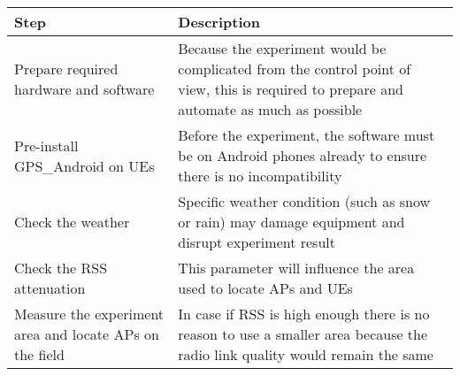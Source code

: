 \begin{longtable}[]{@{}ll@{}}
\toprule
\begin{minipage}[b]{0.27\columnwidth}\raggedright
Step\strut
\end{minipage} & \begin{minipage}[b]{0.67\columnwidth}\raggedright
Description\strut
\end{minipage}\tabularnewline
\midrule
\endhead
\begin{minipage}[t]{0.27\columnwidth}\raggedright
Prepare required hardware and software\strut
\end{minipage} & \begin{minipage}[t]{0.67\columnwidth}\raggedright
Because the experiment would be complicated from the control point of
view, this is required to prepare and automate as much as possible\strut
\end{minipage}\tabularnewline
\begin{minipage}[t]{0.27\columnwidth}\raggedright
Pre-install GPS\_Android on UEs\strut
\end{minipage} & \begin{minipage}[t]{0.67\columnwidth}\raggedright
Before the experiment, the software must be on Android phones already to
ensure there is no incompatibility\strut
\end{minipage}\tabularnewline
\begin{minipage}[t]{0.27\columnwidth}\raggedright
Check the weather\strut
\end{minipage} & \begin{minipage}[t]{0.67\columnwidth}\raggedright
Specific weather condition (such as snow or rain) may damage equipment
and disrupt experiment result\strut
\end{minipage}\tabularnewline
\begin{minipage}[t]{0.27\columnwidth}\raggedright
Check the RSS attenuation\strut
\end{minipage} & \begin{minipage}[t]{0.67\columnwidth}\raggedright
This parameter will influence the area used to locate APs and UEs\strut
\end{minipage}\tabularnewline
\begin{minipage}[t]{0.27\columnwidth}\raggedright
Measure the experiment area and locate APs on the field\strut
\end{minipage} & \begin{minipage}[t]{0.67\columnwidth}\raggedright
In case if RSS is high enough there is no reason to use a smaller area
because the radio link quality would remain the same\strut
\end{minipage}\tabularnewline
\bottomrule
\end{longtable}

